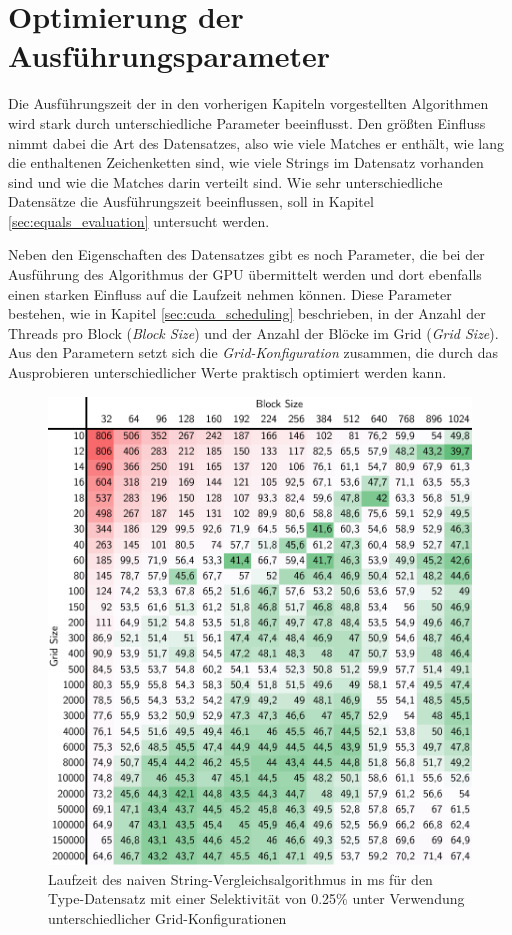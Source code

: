 \chapter{Optimierung der Ausführungsparameter}

Die Ausführungszeit der in den vorherigen Kapiteln vorgestellten Algorithmen wird stark durch unterschiedliche Parameter beeinflusst.
Den größten Einfluss nimmt dabei die Art des Datensatzes, also wie viele Matches er enthält, wie lang die enthaltenen Zeichenketten sind, wie viele Strings im Datensatz vorhanden sind und wie die Matches darin verteilt sind.
Wie sehr unterschiedliche Datensätze die Ausführungszeit beeinflussen, soll in Kapitel \ref{sec:equals_evaluation} untersucht werden.

Neben den Eigenschaften des Datensatzes gibt es noch Parameter, die bei der Ausführung des Algorithmus der GPU übermittelt werden und dort ebenfalls einen starken Einfluss auf die Laufzeit nehmen können.
Diese Parameter bestehen, wie in Kapitel \ref{sec:cuda_scheduling} beschrieben, in der Anzahl der Threads pro Block (\emph{Block Size}) und der Anzahl der Blöcke im Grid (\emph{Grid Size}).
Aus den Parametern setzt sich die \emph{Grid-Konfiguration} zusammen, die durch das Ausprobieren unterschiedlicher Werte praktisch optimiert werden kann.

\begin{figure}[ht]
	\includegraphics[]{bilder/parameter025.pdf}
	\caption{Laufzeit des naiven String-Vergleichsalgorithmus in ms für den Type-Datensatz mit einer Selektivität von 0.25\% unter Verwendung unterschiedlicher Grid-Konfigurationen}
	\label{parameter025}
\end{figure}


